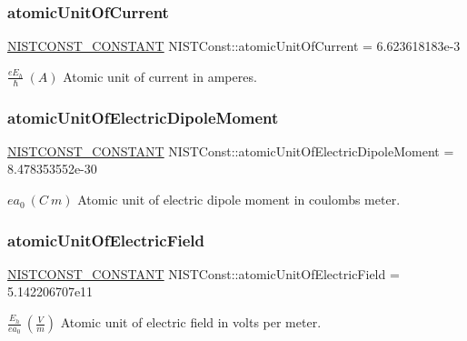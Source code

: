 \subsubsection{\texorpdfstring{atomic\+Unit\+Of\+Current}{atomicUnitOfCurrent}}
{\footnotesize\ttfamily \mbox{\hyperlink{group___n_i_s_t_const-_macros_ga2b0fc1d7452373f816175dd86ce26729}{N\+I\+S\+T\+C\+O\+N\+S\+T\+\_\+\+C\+O\+N\+S\+T\+A\+NT}} N\+I\+S\+T\+Const\+::atomic\+Unit\+Of\+Current = 6.\+623618183e-\/3}

$\frac{e E_h}{\hbar} \ (A)$ Atomic unit of current in amperes. \mbox{\label{group___n_i_s_t_const-_atomic_unit_ga9d0aa0f462c3cbf3000181f1f4dc2e97}} 
\subsubsection{\texorpdfstring{atomic\+Unit\+Of\+Electric\+Dipole\+Moment}{atomicUnitOfElectricDipoleMoment}}
{\footnotesize\ttfamily \mbox{\hyperlink{group___n_i_s_t_const-_macros_ga2b0fc1d7452373f816175dd86ce26729}{N\+I\+S\+T\+C\+O\+N\+S\+T\+\_\+\+C\+O\+N\+S\+T\+A\+NT}} N\+I\+S\+T\+Const\+::atomic\+Unit\+Of\+Electric\+Dipole\+Moment = 8.\+478353552e-\/30}

$e a_0 \ (C\ m)$ Atomic unit of electric dipole moment in coulombs meter. \mbox{\label{group___n_i_s_t_const-_atomic_unit_ga5d6c6686a6a6ea451d3cb975878f623a}} 
\subsubsection{\texorpdfstring{atomic\+Unit\+Of\+Electric\+Field}{atomicUnitOfElectricField}}
{\footnotesize\ttfamily \mbox{\hyperlink{group___n_i_s_t_const-_macros_ga2b0fc1d7452373f816175dd86ce26729}{N\+I\+S\+T\+C\+O\+N\+S\+T\+\_\+\+C\+O\+N\+S\+T\+A\+NT}} N\+I\+S\+T\+Const\+::atomic\+Unit\+Of\+Electric\+Field = 5.\+142206707e11}

$\frac{E_h}{e a_0} \ (\frac{V}{m})$ Atomic unit of electric field in volts per meter. \mbox{\label{group___n_i_s_t_const-_atomic_unit_ga02c36e91d6f95d818656270669d20926}} 
